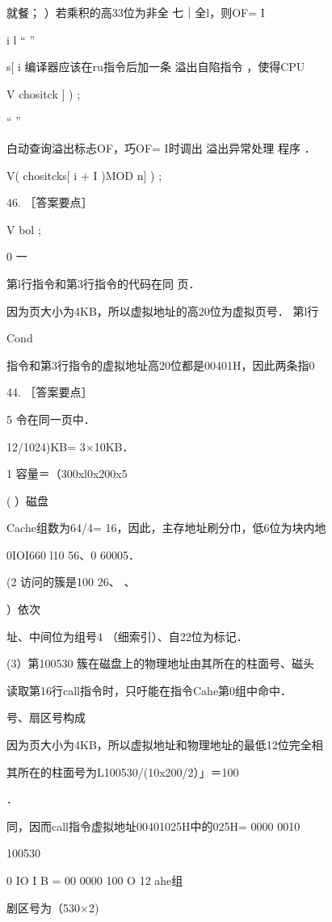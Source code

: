 {{{    就餐；    ）若乘积的高33位为非全    七｜全l，则OF= I

    i   l    “    ”

    s[ i    编译器应该在ru指令后加一条 溢出自陷指令 ，使得CPU

    V chositck   ] ) ;

    “    ”

    白动查询溢出标忐OF，巧OF= I时调出 溢出异常处理 程序 ．

    V( chositcks[ i  + I )MOD n] ) ;

    46. ［答案要点］

    V  bol ;

    0    一

    第l行指令和第3行指令的代码在同   页．

    因为页大小为4KB，所以虚拟地址的高20位为虚拟页号． 第l行

   Cond

    指令和第3行指令的虚拟地址高20位都是00401H，因此两条指0

44. ［答案要点］

    5    令在同一页中．

    12/1024)KB= 3×10KB．

    1     容量＝（300xl0x200x5

   ( ）磁盘

    Cache组数为64/4= 16，因此，主存地址刷分巾，低6位为块内地

    0IOI660 l10 56、0 60005．

   (2    访问的簇是100 26、    、

    ）依次

    址、中间位为组号4    （细索引）、自22位为标记．

   (3）第100530 簇在磁盘上的物理地址由其所在的柱面号、磁头

    读取第16行call指令时，只吁能在指令Cahe第0组中命中．

    号、扇区号构成

    因为页大小为4KB，所以虚拟地址和物理地址的最低12位完全相

    其所在的柱面号为L100530/(10x200/2）」＝100

    ．

    同，因而call指令虚拟地址00401025H中的025H= 0000 0010

    100530 %

    0 IO I B = 00 0000 100 O      12    ahe组

    剧区号为（530×2) %

}}}
